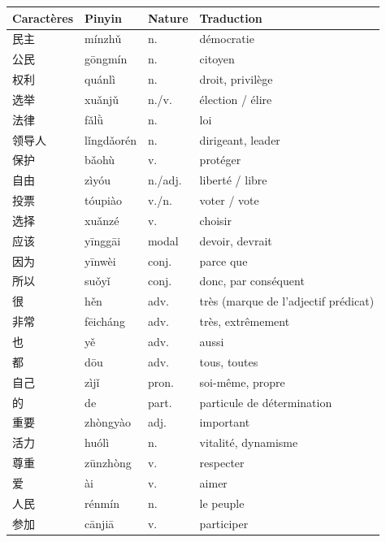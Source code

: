 \documentclass[11pt]{article}
\begin{document}
\begin{center}
\begin{tabularx}{\linewidth}{|X|X|X|X|}
\hline
\rowcolor{popblueL} Caractères & Pinyin & Nature & Traduction \\
\hline
民主 & mínzhǔ & n. & démocratie \\
\hline
公民 & gōngmín & n. & citoyen \\
\hline
权利 & quánlì & n. & droit, privilège \\
\hline
选举 & xuǎnjǔ & n./v. & élection / élire \\
\hline
法律 & fǎlǜ & n. & loi \\
\hline
领导人 & lǐngdǎorén & n. & dirigeant, leader \\
\hline
保护 & bǎohù & v. & protéger \\
\hline
自由 & zìyóu & n./adj. & liberté / libre \\
\hline
投票 & tóupiào & v./n. & voter / vote \\
\hline
选择 & xuǎnzé & v. & choisir \\
\hline
应该 & yīnggāi & modal & devoir, devrait \\
\hline
因为 & yīnwèi & conj. & parce que \\
\hline
所以 & suǒyǐ & conj. & donc, par conséquent \\
\hline
很 & hěn & adv. & très (marque de l'adjectif prédicat) \\
\hline
非常 & fēicháng & adv. & très, extrêmement \\
\hline
也 & yě & adv. & aussi \\
\hline
都 & dōu & adv. & tous, toutes \\
\hline
自己 & zìjǐ & pron. & soi-même, propre \\
\hline
的 & de & part. & particule de détermination \\
\hline
重要 & zhòngyào & adj. & important \\
\hline
活力 & huólì & n. & vitalité, dynamisme \\
\hline
尊重 & zūnzhòng & v. & respecter \\
\hline
爱 & ài & v. & aimer \\
\hline
人民 & rénmín & n. & le peuple \\
\hline
参加 & cānjiā & v. & participer \\
\hline
\end{tabularx}
\end{center}
\end{document}
